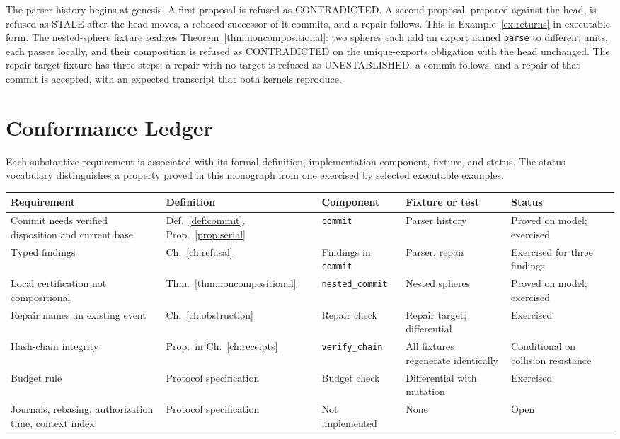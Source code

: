\documentclass[12pt,oneside,openany]{book}
\theoremstyle{spherepop}
\theoremstyle{remarkstyle}
\begin{document}
The parser history begins at genesis. A first proposal is refused as \textsf{CONTRADICTED}. A second proposal, prepared against the head, is refused as \textsf{STALE} after the head moves, a rebased successor of it commits, and a repair follows. This is Example~\ref{ex:returns} in executable form. The nested-sphere fixture realizes Theorem~\ref{thm:noncompositional}: two spheres each add an export named \texttt{parse} to different units, each passes locally, and their composition is refused as \textsf{CONTRADICTED} on the \textsf{unique-exports} obligation with the head unchanged. The repair-target fixture has three steps: a repair with no target is refused as \textsf{UNESTABLISHED}, a commit follows, and a repair of that commit is accepted, with an expected transcript that both kernels reproduce.

\section{Conformance Ledger}

Each substantive requirement is associated with its formal definition, implementation component, fixture, and status. The status vocabulary distinguishes a property proved in this monograph from one exercised by selected executable examples.

\medskip
\begin{center}
\footnotesize
\setlength{\tabcolsep}{3pt}
\begin{tabular}{p{}p{}p{}p{}p{}}
\toprule
Requirement & Definition & Component & Fixture or test & Status \\
\midrule
Commit needs verified disposition and current base & Def.~\ref{def:commit}, Prop.~\ref{prop:serial} & \texttt{commit} & Parser history & Proved on model; exercised \\
Typed findings & Ch.~\ref{ch:refusal} & Findings in \texttt{commit} & Parser, repair & Exercised for three findings \\
Local certification not compositional & Thm.~\ref{thm:noncompositional} & \texttt{nested\_\allowbreak commit} & Nested spheres & Proved on model; exercised \\
Repair names an existing event & Ch.~\ref{ch:obstruction} & Repair check & Repair target; differential & Exercised \\
Hash-chain integrity & Prop.\ in Ch.~\ref{ch:receipts} & \texttt{verify\_\allowbreak chain} & All fixtures regenerate identically & Conditional on collision resistance \\
Budget rule & Protocol specification & Budget check & Differential with mutation & Exercised \\
Journals, rebasing, authorization time, context index & Protocol specification & Not implemented & None & Open \\
\bottomrule
\end{tabular}
\end{center}
\end{document}

